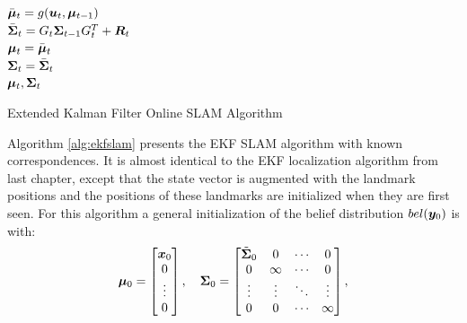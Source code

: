 \begin{algorithm}[ht]
 $\bar{\bm{\mu}}_t = g(\bm{u}_t,\bm{\mu}_{t-1})$\\
 $\bar{\bm{\Sigma}}_t = G_t\bm{\Sigma}_{t-1} G_t^{T} + \bm{R}_t$\\
 $\bm{\mu}_t = \bar{\bm{\mu}}_t$\\
 $\bm{\Sigma}_t = \bar{\bm{\Sigma}}_t$\\
 \Return $\bm{\mu}_t, \bm{\Sigma}_t$
 \caption{Extended Kalman Filter Online SLAM Algorithm}
 \label{alg:ekfslam}
\end{algorithm}
Algorithm \ref{alg:ekfslam} presents the EKF SLAM algorithm with known correspondences. It is almost identical to the EKF localization algorithm from last chapter, except that the state vector is augmented with the landmark positions and the positions of these landmarks are initialized when they are first seen. For this algorithm a general initialization of the belief distribution $bel(\bm{y}_0)$ is with:
\begin{equation*}
\bm{\mu}_0 = \begin{bmatrix}
\bm{x}_0 \\ 0 \\ \vdots \\ 0
\end{bmatrix}, \quad \bm{\Sigma}_0 = \begin{bmatrix}
\tilde{\bm{\Sigma}}_0 & 0 & \cdots & 0 \\
    0 & \infty & \cdots & 0 \\
     \vdots & \vdots & \ddots & \vdots \\
    0 & 0 & \cdots & \infty \\
\end{bmatrix},
\end{equation*}
